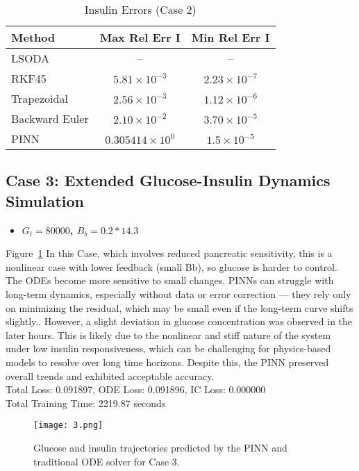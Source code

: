 \documentclass[conference]{IEEEtran}
\begin{document}
\begin{table}[H]
\centering
\caption{Insulin Errors (Case 2)}
\begin{tabular}{|l|c|c|}
\hline
\textbf{Method} & \textbf{Max Rel Err I} & \textbf{Min Rel Err I} \\
\hline
LSODA & -- & -- \\
RKF45 & $5.81 \times 10^{-3}$ & $2.23 \times 10^{-7}$ \\
Trapezoidal & $2.56 \times 10^{-3}$ & $1.12 \times 10^{-6}$ \\
Backward Euler & $2.10 \times 10^{-2}$ & $3.70 \times 10^{-5}$ \\
PINN & $0.305414 \times 10^{0}$ & $1.5 \times 10^{-5}$ \\
\hline
\end{tabular}
\end{table}

\subsection{Case 3: Extended Glucose-Insulin Dynamics Simulation}
\begin{itemize}
\item \textbf{ $G_t = 80000$, $B_b = 0.2 * 14.3$} \\
\end{itemize}
Figure~\ref{fig:case3} In this Case, which involves reduced pancreatic sensitivity, this is a nonlinear case with lower feedback (small Bb), so glucose is harder to control.
The ODEs become more sensitive to small changes.
PINNs can struggle with long-term dynamics, especially without data or error correction — they rely only on minimizing the residual, which may be small even if the long-term curve shifts slightly.. However, a slight deviation in glucose concentration was observed in the later hours. This is likely due to the nonlinear and stiff nature of the system under low insulin responsiveness, which can be challenging for physics-based models to resolve over long time horizons. Despite this, the PINN preserved overall trends and exhibited acceptable accuracy.\\
Total Loss: 0.091897, ODE Loss: 0.091896, IC Loss: 0.000000\\
Total Training Time:   2219.87 seconds
\begin{figure}[htbp]
   \centering
   \texttt{[image: 3.png]}
    \caption{Glucose and insulin trajectories predicted by the PINN and traditional ODE solver for Case 3.}
   \label{fig:case3}
\end{figure}
\end{document}
